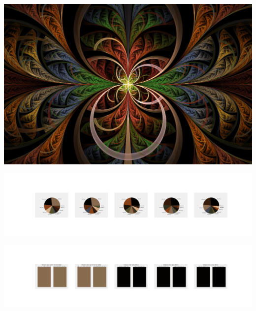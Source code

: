\documentclass[11pt]{article}
\begin{document}
\begin{landscape}
    \begin{center}
    \includegraphics[width=\textwidth]{./nbimg/file (33).jpg}
    \end{center}

    \begin{center}
    \includegraphics[width=250mm]{./nbimg/pie-256.jpg}
    \end{center}

    \begin{center}
    \includegraphics[width=250mm]{./nbimg/peak-256.jpg}
    \end{center}
    


\end{landscape}
\end{document}
